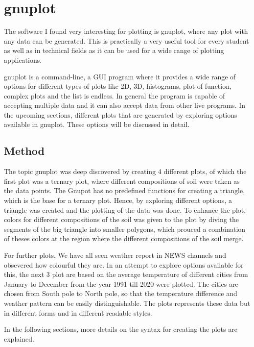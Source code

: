 \documentclass[runningheads]{llncs}
\begin{document}
\section{gnuplot}
The software I found very interesting for plotting is gnuplot, where any plot with any data can be generated. This is practically a very useful tool for every student as well as in technical fields as it can be used for a wide range of plotting applications. 

gnuplot is a command-line, a GUI program where it provides a wide range of options for different types of plots like 2D, 3D, histograms, plot of function, complex plots and the list is endless. In general the program is capable of accepting multiple data and it can also accept data from other live programs. In the upcoming sections, different plots that are generated by exploring options available in gnuplot. These options will be discussed in detail.  


\subsection{Method}
The topic gnuplot was deep discovered by creating 4 different plots, of which the first plot was a ternary plot, where different compositions of soil were taken as the data points. The Gnupot has no predefined functions for creating a triangle, which is the base for a ternary plot. Hence, by exploring different options, a triangle was created and the plotting of the data was done. To enhance the plot, colors for different compositions of the soil was given to the plot by diving the segments of the big triangle into smaller polygons, which prouced a combination of theses colors at the region where the different compositions of the soil merge.

For further plots, We have all seen weather report in NEWS channels and obsevered how colourful they are. In an attempt to explore options available for this, the next 3 plot are based on the average temperature of different cities from January to December from the year 1991 till 2020 were plotted. The cities are chosen from South pole to North pole, so that the temperature difference and weather pattern can be easily distinguishable. The plots represents these data but in different forms and in different readable styles. 

In the following sections, more details on the syntax for creating the plots are explained.
\end{document}
